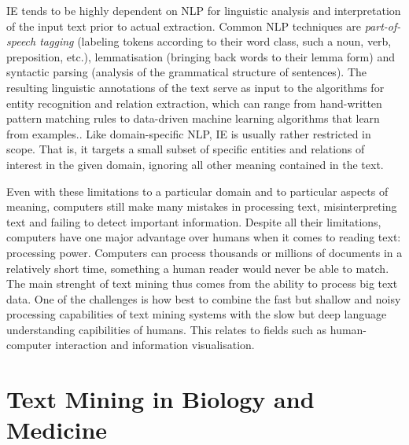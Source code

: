 IE tends to be highly dependent on NLP for linguistic analysis and interpretation of the input text prior to actual extraction.
Common NLP techniques are \emph{part-of-speech tagging} (labeling tokens according to their word class, such a noun, verb, preposition, etc.), lemmatisation (bringing back words to their lemma form) and syntactic parsing (analysis of the grammatical structure of sentences).
The resulting linguistic annotations of the text serve as input to the algorithms for entity recognition and relation extraction, which can range from hand-written pattern matching rules to data-driven machine learning algorithms that learn from examples..
Like domain-specific NLP, IE is usually rather restricted in scope.
That is, it targets a small subset of specific entities and relations of interest in the given domain, ignoring all other meaning contained in the text.    

Even with these limitations to a particular domain and to particular aspects of meaning, computers still make many mistakes in processing text, misinterpreting text and failing to detect important information.
Despite all their limitations, computers have one major advantage over humans when it comes to reading text: processing power.
Computers can process thousands or millions of documents in a relatively short time, something a human reader would never be able to match.
The main strenght of text mining thus comes from the ability to process big text data.
One of the challenges is how best to combine the fast but shallow and noisy processing capabilities of text mining systems with the slow but deep language understanding capibilities of humans.
This relates to fields such as human-computer interaction and information visualisation.   

\section{Text Mining in Biology and Medicine}
\label{sec:tm-biomed}

